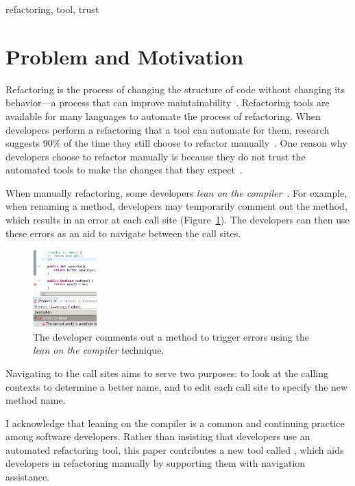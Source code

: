 \documentclass{sigplanconf}
\begin{document}

\keywords
refactoring, tool, trust


\section{Problem and Motivation}
Refactoring is the process of changing the structure of code without changing
its behavior---a process that can improve
maintainability~\cite{maintainability}.
Refactoring tools are available for many languages to automate the process of
refactoring. When developers perform a refactoring that a tool can automate for
them, research suggests 90\% of the time they still choose to refactor
manually~\cite{how-refactor}. One reason why developers choose to refactor
manually is because they do not trust the automated tools to make the changes
that they expect~\cite{how-refactor, say-refactor}. 

When manually refactoring, some developers
\textit{lean on the compiler}~\cite{legacy-code, how-refactor}.
For example, when renaming a method, developers may temporarily comment
out the method, which results
in an error at each call site (Figure~\ref{comment}). The developers can then
use these errors as an aid to navigate between the call sites.
\begin{figure}[h]
\begin{center}
\includegraphics[width=0.22\textwidth]{comment.png}
\caption{The developer comments out a method to trigger errors using the
\textit{lean on the compiler} technique.\label{comment}}
\end{center}
\end{figure}
Navigating to the call sites aims to serve two purposes: to look at the calling
contexts to determine a better name, and to edit each call site to specify
the new method name.

I acknowledge that leaning on the compiler is a common and continuing practice
among software developers. Rather than insisting that developers use an
automated refactoring tool, this paper contributes a new tool
called \pname{}, which aids developers in refactoring
manually by supporting them with navigation assistance.
\end{document}
